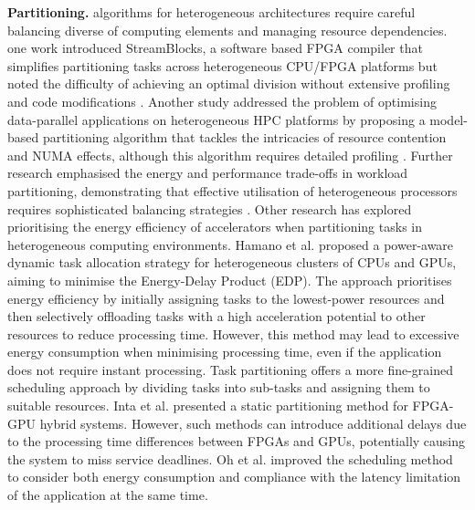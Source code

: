 \documentclass[]{spie}  %
\begin{document}
\noindent\textbf{Partitioning.} algorithms for heterogeneous architectures require careful balancing diverse of computing elements and managing resource dependencies\cite{shekhar2015}. one work introduced StreamBlocks, a software based FPGA compiler that simplifies partitioning tasks across heterogeneous CPU/FPGA platforms but noted the difficulty of achieving an optimal division without extensive profiling and code modifications \cite{emami2022}. Another study addressed the problem of optimising data-parallel applications on heterogeneous HPC platforms by proposing a model-based partitioning algorithm that tackles the intricacies of resource contention and NUMA effects, although this algorithm requires detailed profiling \cite{khaleghzadeh2018}. Further research emphasised the energy and performance trade-offs in workload partitioning, demonstrating that effective utilisation of heterogeneous processors requires sophisticated balancing strategies \cite{tang2017}. Other research has explored prioritising the energy efficiency of accelerators when partitioning tasks in heterogeneous computing environments. Hamano et al.\cite{Hamano} proposed a power-aware dynamic task allocation strategy for heterogeneous clusters of CPUs and GPUs, aiming to minimise the Energy-Delay Product (EDP). The approach prioritises energy efficiency by initially assigning tasks to the lowest-power resources and then selectively offloading tasks with a high acceleration potential to other resources to reduce processing time. However, this method may lead to excessive energy consumption when minimising processing time, even if the application does not require instant processing. Task partitioning offers a more fine-grained scheduling approach by dividing tasks into sub-tasks and assigning them to suitable resources. Inta et al.\cite{IntBowDav12} presented a static partitioning method for FPGA-GPU hybrid systems. However, such methods can introduce additional delays due to the processing time differences between FPGAs and GPUs, potentially causing the system to miss service deadlines. Oh et al.\cite{OhHanYan18} improved the scheduling method to consider both energy consumption and compliance with the latency limitation of
the application at the same time.
\end{document}
